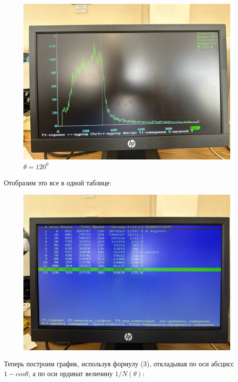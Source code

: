 \documentclass[a4paper, 12pt]{article}
\begin{document}
\begin{figure}[H]
\begin{minipage}[h]{0.3\linewidth}
        \includegraphics[width = 1\linewidth]{res/013.jpg}
        \caption{$\theta = 120^0$}
        \end{minipage}
    \end{figure}

    Отобразим это все в одной таблице: 
    \begin{figure}[H]
        \centering
        \includegraphics[width=0.7\linewidth]{res/2.jpg}
    \end{figure}

    Теперь построим график, используя формулу (3), откладывая по оси абсцисс $1 - cos \theta$, 
    а по оси ординат величину $1/N(\theta)$:
\end{document}
